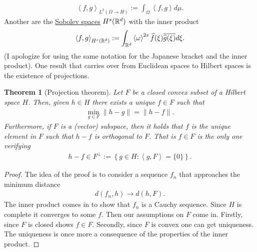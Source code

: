 \documentclass[12pt]{article}
\newtheorem{theorem}{Theorem}
\newcommand{\br}[1]{\left\langle#1\right\rangle} \newcommand{\set}[1]{\left\{#1\right\}}\newcommand{\qt}[1]{\left(#1\right)} \newcommand{\qp}[1]{\left(#1\right)}\newcommand{\qb}[1]{\left[#1\right]}
\renewcommand{\norm}[1]{\lVert #1 \rVert}\renewcommand{\abs}[1]{\left| #1 \right|}
\begin{document}
\begin{CJK*}{UTF8}{gbsn}
	\begin{align*}
		\br{f,g}_{L^2(\Omega \to H)}:= \int_{\Omega} \br{f,g} d\mu .
	\end{align*}
	Another are the \href{https://nowheredifferentiable.com/2022-05-27-The-Bochner-integral/#:~:text=we%20can%20integrate.-,Our,-next%20definitions%20are}{Sobolev spaces} $H^s(\mathbb{R}^d)$ with the inner product
	\begin{align*}
		\br{f,g}_{H^s(\R^d)}:= \int_{\R^d} \br{\omega}^{2s} \wh{f}(\xi ) \overline{\wh{g}(\xi )}d\xi  .
	\end{align*}
	(I apologize for using the same notation for the Japanese bracket and the inner product). One result that carries over from Euclidean spaces to Hilbert spaces is the existence of projections.
	\begin{theorem}[Projection theorem]\label{projection}
		Let $F$ be a closed convex subset of a Hilbert space $H$. Then, given  $h \in H$ there exists a unique $ f \in F$ such that
		\begin{align*}
			\min_{g \in F}\norm{h-g}= \norm{h-f}.
		\end{align*}
		Furthermore, if $F$ is a (vector) subspace, then it holds that $f$ is the unique element in  $F$ such that $h-f$ is orthogonal to  $F$. That is $f\in F$ is the only one verifying
		\begin{align*}
			h-f \in F^\perp:= \set{g \in H : \br{g,F}=\{0\}}.
		\end{align*}
	\end{theorem}
	\begin{proof}
		The idea of the proof is to consider a sequence $f_n$ that approaches the minimum distance
		\begin{align*}
			d(f_n,h)\to d(h,F).
		\end{align*}
		The inner product comes in to show that  $f_n$ is a Cauchy sequence. Since $H$ is complete it converges to some  $f$. Then our assumptions on $F$ come in. Firstly, since $F$ is closed shows $f \in F$. Secondly, since $F$ is convex one can get uniqueness. The uniqueness is once more a consequence of the properties of the inner product.
	\end{proof}


\end{CJK*}
\end{document}
